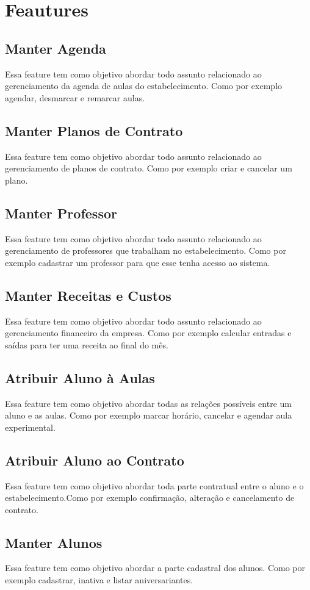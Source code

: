 \section[Features]{Feautures}
\subsection[Manter Agenda]{Manter Agenda}
Essa feature tem como objetivo abordar todo assunto relacionado ao gerenciamento
da agenda de aulas do estabelecimento. Como por exemplo agendar, desmarcar e
remarcar aulas.

\subsection[Manter Planos de Contrato]{Manter Planos de Contrato}
Essa feature tem como objetivo abordar todo assunto relacionado ao gerenciamento
de planos de contrato. Como por exemplo criar e cancelar um plano.

\subsection[Manter Professor]{Manter Professor}
Essa feature tem como objetivo abordar todo assunto relacionado ao gerenciamento
de professores que trabalham no estabelecimento. Como por exemplo cadastrar
um professor para que esse tenha acesso ao sistema.

\subsection[Manter Receitas e Custos]{Manter Receitas e Custos}
Essa feature tem como objetivo abordar todo assunto relacionado ao gerenciamento
financeiro da empresa. Como por exemplo calcular entradas e saídas para ter uma
receita ao final do mês.

\subsection[Atribuir Aluno à Aulas]{Atribuir Aluno à Aulas}
Essa feature tem como objetivo abordar todas as relações possíveis entre
um aluno e as aulas. Como por exemplo marcar horário, cancelar e agendar aula
experimental.

\subsection[Atribuir Aluno ao Contrato]{Atribuir Aluno ao Contrato}
Essa feature tem como objetivo abordar toda parte contratual entre o aluno e o
estabelecimento.Como por exemplo confirmação, alteração e cancelamento de
contrato.

\subsection[Manter Alunos]{Manter Alunos}
Essa feature tem como objetivo abordar a parte cadastral dos alunos. Como por
exemplo cadastrar, inativa e listar aniversariantes.
